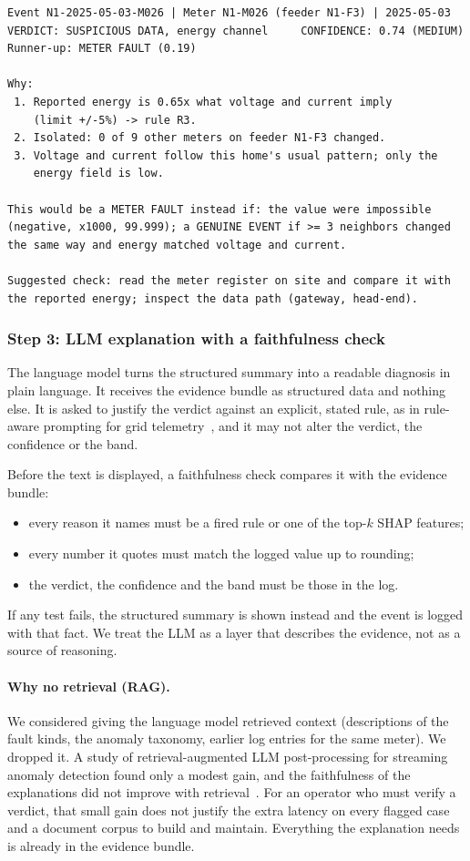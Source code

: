 \documentclass[11pt,a4paper]{article}
\begin{document}
\begin{lstlisting}
Event N1-2025-05-03-M026 | Meter N1-M026 (feeder N1-F3) | 2025-05-03
VERDICT: SUSPICIOUS DATA, energy channel     CONFIDENCE: 0.74 (MEDIUM)
Runner-up: METER FAULT (0.19)

Why:
 1. Reported energy is 0.65x what voltage and current imply
    (limit +/-5%) -> rule R3.
 2. Isolated: 0 of 9 other meters on feeder N1-F3 changed.
 3. Voltage and current follow this home's usual pattern; only the
    energy field is low.

This would be a METER FAULT instead if: the value were impossible
(negative, x1000, 99.999); a GENUINE EVENT if >= 3 neighbors changed
the same way and energy matched voltage and current.

Suggested check: read the meter register on site and compare it with
the reported energy; inspect the data path (gateway, head-end).
\end{lstlisting}

\subsubsection*{Step 3: LLM explanation with a faithfulness check}
The language model turns the structured summary into a readable diagnosis in plain language. It receives the
evidence bundle as structured data and nothing else. It is asked to justify the verdict against an explicit,
stated rule, as in rule-aware prompting for grid telemetry~\cite{ruleaware}, and it may not alter the verdict,
the confidence or the band.

Before the text is displayed, a faithfulness check compares it with the evidence bundle:
\begin{itemize}[leftmargin=*,itemsep=1pt]
  \item every reason it names must be a fired rule or one of the top-$k$ SHAP features;
  \item every number it quotes must match the logged value up to rounding;
  \item the verdict, the confidence and the band must be those in the log.
\end{itemize}
If any test fails, the structured summary is shown instead and the event is logged with that fact. We treat the
LLM as a layer that describes the evidence, not as a source of reasoning.

\paragraph{Why no retrieval (RAG).} We considered giving the language model retrieved context (descriptions of
the fault kinds, the anomaly taxonomy, earlier log entries for the same meter). We dropped it. A study of
retrieval-augmented LLM post-processing for streaming anomaly detection found only a modest gain, and the
faithfulness of the explanations did not improve with retrieval~\cite{ragaudit}. For an operator who must verify
a verdict, that small gain does not justify the extra latency on every flagged case and a document corpus to
build and maintain. Everything the explanation needs is already in the evidence bundle.
\end{document}
